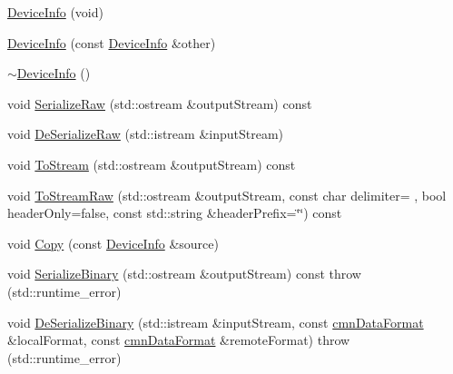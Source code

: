 \begin{DoxyCompactItemize}
\item 
\hyperlink{classsvl_filter_source_video_capture_types_1_1_device_info_a478e99b5870a4edc8cea32852f3eb14e}{Device\+Info} (void)
\item 
\hyperlink{classsvl_filter_source_video_capture_types_1_1_device_info_abde06af0c15463c012ace8a646062c1e}{Device\+Info} (const \hyperlink{classsvl_filter_source_video_capture_types_1_1_device_info}{Device\+Info} \&other)
\item 
\hyperlink{classsvl_filter_source_video_capture_types_1_1_device_info_a9cf1bf1b7baedeec2032c38e59e77028}{$\sim$\+Device\+Info} ()
\item 
void \hyperlink{classsvl_filter_source_video_capture_types_1_1_device_info_a570d32a1ebc0eec407c38a0e58e24389}{Serialize\+Raw} (std\+::ostream \&output\+Stream) const 
\item 
void \hyperlink{classsvl_filter_source_video_capture_types_1_1_device_info_a3b5d8bb54395d95ff928a5c723d91beb}{De\+Serialize\+Raw} (std\+::istream \&input\+Stream)
\item 
void \hyperlink{classsvl_filter_source_video_capture_types_1_1_device_info_a9b0cb4c421e5466196ea304b40f93bf1}{To\+Stream} (std\+::ostream \&output\+Stream) const 
\item 
void \hyperlink{classsvl_filter_source_video_capture_types_1_1_device_info_a9425da38e7f65d621417a57eba229e5d}{To\+Stream\+Raw} (std\+::ostream \&output\+Stream, const char delimiter= \textquotesingle{} \textquotesingle{}, bool header\+Only=false, const std\+::string \&header\+Prefix=\char`\"{}\char`\"{}) const 
\item 
void \hyperlink{classsvl_filter_source_video_capture_types_1_1_device_info_add01d90468559ab139b63f3baa4f5e40}{Copy} (const \hyperlink{classsvl_filter_source_video_capture_types_1_1_device_info}{Device\+Info} \&source)
\item 
void \hyperlink{classsvl_filter_source_video_capture_types_1_1_device_info_ab2ebad5e69dc641833fbe0d26c26dc2b}{Serialize\+Binary} (std\+::ostream \&output\+Stream) const   throw (std\+::runtime\+\_\+error)
\item 
void \hyperlink{classsvl_filter_source_video_capture_types_1_1_device_info_a58b214c0ad4ec66f27884b495990553b}{De\+Serialize\+Binary} (std\+::istream \&input\+Stream, const \hyperlink{classcmn_data_format}{cmn\+Data\+Format} \&local\+Format, const \hyperlink{classcmn_data_format}{cmn\+Data\+Format} \&remote\+Format)  throw (std\+::runtime\+\_\+error)
\item 

\end{DoxyCompactItemize}
